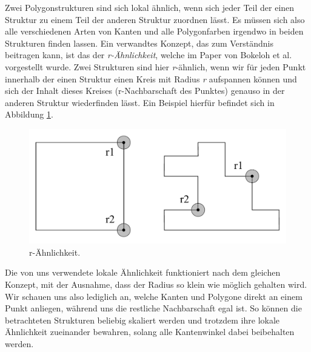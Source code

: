 Zwei Polygonstrukturen sind sich lokal ähnlich, wenn sich jeder Teil der einen Struktur zu einem Teil der anderen Struktur zuordnen lässt. Es
müssen sich also alle verschiedenen Arten von Kanten und alle Polygonfarben irgendwo in beiden Strukturen finden lassen. Ein verwandtes Konzept,
das zum Verständnis beitragen kann, ist das der \textit{r-Ähnlichkeit}, welche im Paper von Bokeloh et al. \cite{3_bokeloh_et_al} vorgestellt wurde.
Zwei Strukturen sind hier
\textit{r}-ähnlich, wenn wir für jeden Punkt innerhalb der einen Struktur einen Kreis mit Radius \textit{r} aufspannen können und sich der Inhalt
dieses Kreises (r-Nachbarschaft des Punktes) genauso in der anderen Struktur wiederfinden lässt. Ein Beispiel hierfür befindet sich in Abbildung
\ref{fig:rsimilarity}.

\begin{figure}[t]
    \centering
    \includegraphics[height=\imgHeight]{images/rsimilarity.pdf}
    \caption{r-Ähnlichkeit.}
    \label{fig:rsimilarity}
\end{figure}

Die von uns verwendete lokale Ähnlichkeit funktioniert nach dem gleichen Konzept, mit der Ausnahme, dass der Radius so klein wie möglich gehalten
wird. Wir schauen uns also lediglich an, welche Kanten und Polygone direkt an einem Punkt anliegen, während uns die restliche Nachbarschaft
egal ist. So können die betrachteten Strukturen beliebig skaliert werden und trotzdem ihre lokale Ähnlichkeit zueinander bewahren, solang alle
Kantenwinkel dabei beibehalten werden.

